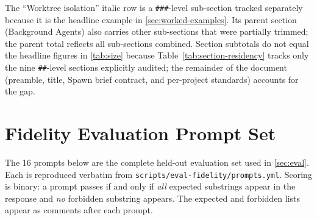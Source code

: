\noindent
The ``Worktree isolation'' italic row is a \texttt{\#\#\#}-level sub-section
tracked separately because it is the headline example in
\cref{sec:worked-examples}. Its parent section (Background Agents) also
carries other sub-sections that were partially trimmed; the parent total
reflects all sub-sections combined. Section subtotals do not equal the
headline figures in \cref{tab:size} because Table~\ref{tab:section-residency}
tracks only the nine \texttt{\#\#}-level sections explicitly audited; the
remainder of the document (preamble, title, Spawn brief contract, and
per-project standards) accounts for the gap.

\section{Fidelity Evaluation Prompt Set}
\label{sec:appendix-prompts}

The 16 prompts below are the complete held-out evaluation set used in
\cref{sec:eval}. Each is reproduced verbatim from
\texttt{scripts/eval-fidelity/prompts.yml}. Scoring is binary: a prompt
passes if and only if \emph{all} expected substrings appear in the response
and \emph{no} forbidden substring appears. The expected and forbidden lists
appear as comments after each prompt.

